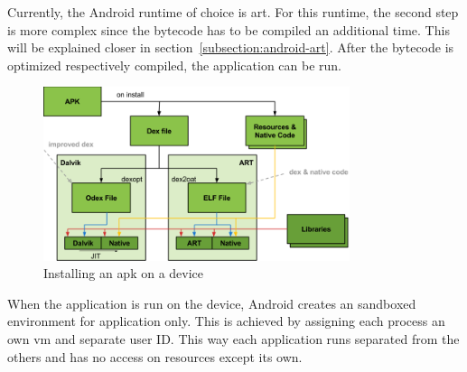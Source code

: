 \newline
Currently, the Android runtime of choice is \gls{art}.
For this runtime, the second step is more complex since the bytecode has to be compiled an additional time.
This will be explained closer in section~\ref{subsection:android-art}.
\newline
After the bytecode is optimized respectively compiled, the application can be run.
\newline
\begin{figure}[h]
    \centering
    \includegraphics[width=0.8\textwidth]{data/install.png}
    \caption{Installing an \gls{apk} on a device \cite{googleIOArt}}
    \label{fig:install}
\end{figure}
When the application is run on the device, Android creates an sandboxed environment for application only.
This is achieved by assigning each process an own \gls{vm} and separate user ID.
This way each application runs separated from the others and has no access on resources except its own. \cite{developerFundamentals}
